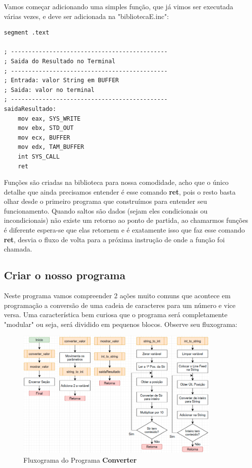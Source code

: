 Vamos começar adicionando uma simples função, que já vimos ser executada várias vezes, e deve ser adicionada na "bibliotecaE.inc":

\begin{lstlisting}[]
segment .text

; ---------------------------------------------
; Saida do Resultado no Terminal
; ---------------------------------------------
; Entrada: valor String em BUFFER
; Saida: valor no terminal
; ---------------------------------------------
saidaResultado:
	mov eax, SYS_WRITE
	mov ebx, STD_OUT
	mov ecx, BUFFER
	mov edx, TAM_BUFFER
	int SYS_CALL
	ret
\end{lstlisting}

Funções são criadas na biblioteca para nossa comodidade, acho que o único detalhe que ainda precisamos entender é esse comando \textbf{ret}, pois o resto basta olhar desde o primeiro programa que construímos para entender seu funcionamento. Quando saltos são dados (sejam eles condicionais ou incondicionais) não existe um retorno ao ponto de partida, ao chamarmos funções é diferente espera-se que elas retornem e é exatamente isso que faz esse comando \textbf{ret}, desvia o fluxo de volta para a próxima instrução de onde a função foi chamada.

\subsection{Criar o nosso programa}
Neste programa vamos compreender 2 ações muito comuns que acontece em programação a conversão de uma cadeia de caracteres para um número e vice versa. Uma característica bem curiosa que o programa será completamente "modular" ou seja, será dividido em pequenos blocos. Observe seu fluxograma:
\begin{figure}[H]
	\centering
	\includegraphics[width=0.9\textwidth]{Pictures/cap01/programa4}
	\caption{Fluxograma do Programa \textbf{Converter}}
\end{figure}

